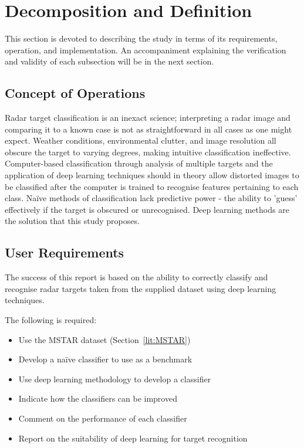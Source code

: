 \section{Decomposition and Definition}
This section is devoted to describing the study in terms of its requirements, operation, and implementation. An accompaniment explaining the verification and validity of each subsection will be in the next section.
\subsection{Concept of Operations}
Radar target classification is an inexact science; interpreting a radar image and comparing it to a known case is not as straightforward in all cases as one might expect. Weather conditions, environmental clutter, and image resolution all obscure the target to varying degrees, making intuitive classification ineffective. Computer-based classification through analysis of multiple targets and the application of deep learning techniques should in theory allow distorted images to be classified after the computer is trained to recognise features pertaining to each class. Na{\"i}ve methods of classification lack predictive power - the ability to 'guess' effectively if the target is obscured or unrecognised. Deep learning methods are the solution that this study proposes.

\subsection{User Requirements}\label{sec:user_req}
The success of this report is based on the ability to correctly classify and recognise radar targets taken from the supplied dataset using deep learning techniques. 

The following is required:

\begin{itemize}
	\item Use the MSTAR dataset (Section~\ref{lit:MSTAR})
	\item Develop a na{\"i}ve classifier to use as a benchmark
	\item Use deep learning methodology to develop a classifier 
	\item Indicate how the classifiers can be improved
	\item Comment on the performance of each classifier
	\item Report on the suitability of deep learning for target recognition
\end{itemize}

